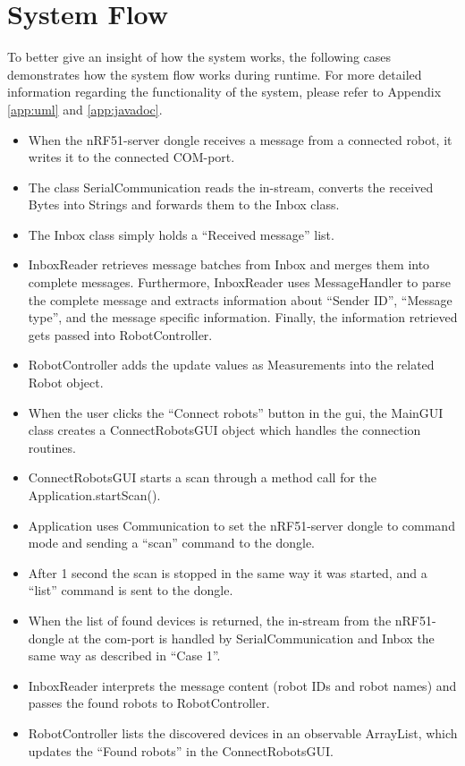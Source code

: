 \section{System Flow}
To better give an insight of how the system works, the following cases demonstrates how the system flow works during runtime. For more detailed information regarding the functionality of the system, please refer to Appendix \ref{app:uml} and \ref{app:javadoc}.

\begin{itemize}
    \item When the nRF51-server dongle receives a message from a connected robot, it writes it to the connected COM-port.
    \item The class SerialCommunication reads the in-stream, converts the received Bytes into Strings and forwards them to the Inbox class.
    \item The Inbox class simply holds a ``Received message'' list.
    \item InboxReader retrieves message batches from Inbox and merges them into complete messages. Furthermore, InboxReader uses MessageHandler to parse the complete message and extracts information about ``Sender ID'', ``Message type'', and the message specific information. Finally, the information retrieved gets passed into RobotController.
    \item RobotController adds the update values as Measurements into the related Robot object.
\end{itemize}

\begin{itemize}
    \item When the user clicks the ``Connect robots'' button in the \acrshort{gui}, the MainGUI class creates a ConnectRobotsGUI object which handles the connection routines.
    \item ConnectRobotsGUI starts a scan through a method call for the Application.startScan().
    \item Application uses Communication to set the nRF51-server dongle to command mode and sending a ``scan'' command to the dongle.
    \item After 1 second the scan is stopped in the same way it was started, and a ``list'' command is sent to the dongle.
    \item When the list of found devices is returned, the in-stream from the nRF51-dongle at the \acrshort{com}-port is handled by SerialCommunication and Inbox the same way as described in ``Case 1''.
    \item InboxReader interprets the message content (robot IDs and robot names) and passes the found robots to RobotController.
    \item RobotController lists the discovered devices in an observable ArrayList, which updates the ``Found robots'' in the ConnectRobotsGUI.
\end{itemize}